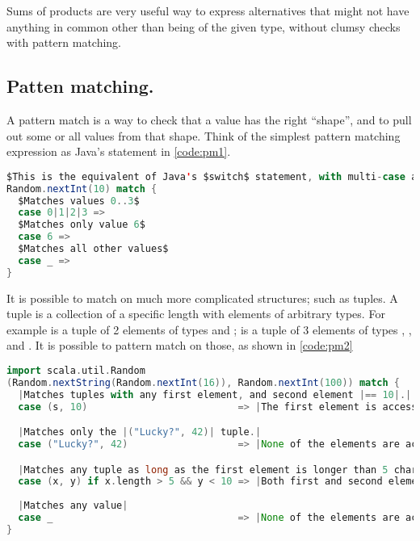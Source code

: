 \documentclass[10 pt]{article}
\begin{document}
Sums of products are very useful way to express alternatives that might not have anything in common other than being of the given type, without clumsy  checks with pattern matching.

\subsection{Patten matching.} 
A pattern match is a way to check that a value has the right ``shape'', and to pull out some or all values from that shape. Think of the simplest pattern matching expression as Java's  statement in \autoref{code:pm1}.

\begin{lstlisting}[caption={Pattern matching}, label={code:pm1}, language=Scala, escapechar=$]
$This is the equivalent of Java's $switch$ statement, with multi-case and a default case.$
Random.nextInt(10) match {
  $Matches values 0..3$
  case 0|1|2|3 =>
  $Matches only value 6$
  case 6 =>
  $Matches all other values$
  case _ =>
}
\end{lstlisting}

It is possible to match on much more complicated structures; such as tuples. A tuple is a collection of a specific length with elements of arbitrary types. For example  is a tuple of 2 elements of types  and ;  is a tuple of 3 elements of types , , and . It is possible to pattern match on those, as shown in \autoref{code:pm2}

\begin{lstlisting}[caption={Pattern matching II}, label={code:pm2}, language=Scala, escapechar=|]
import scala.util.Random
(Random.nextString(Random.nextInt(16)), Random.nextInt(100)) match {
  |Matches tuples with any first element, and second element |== 10|.|
  case (s, 10)                          => |The first element is accessible as |s| here.|

  |Matches only the |("Lucky?", 42)| tuple.|
  case ("Lucky?", 42)                   => |None of the elements are accessible here.|

  |Matches any tuple as long as the first element is longer than 5 characters and second element is less than 10.|
  case (x, y) if x.length > 5 && y < 10 => |Both first and second elements are accessible as |x| and |y|.|
  
  |Matches any value|
  case _                                => |None of the elements are accessible here.|
}
\end{lstlisting}
\end{document}
